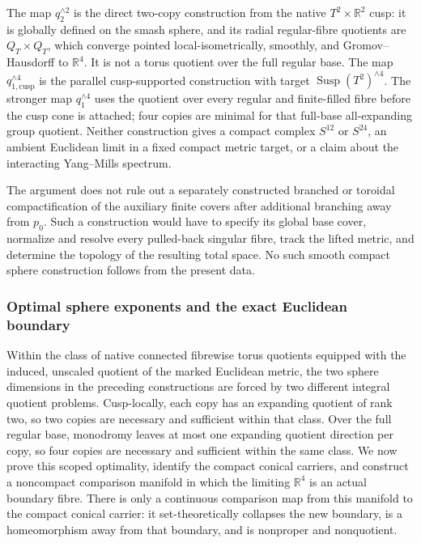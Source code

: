 The map \(q_2^{\wedge2}\) is the direct two-copy construction from the
native \(T^2\times\mathbb R^2\) cusp: it is globally defined on the smash
sphere, and its radial regular-fibre quotients are \(Q_T\times Q_T\), which
converge pointed local-isometrically, smoothly, and Gromov--Hausdorff to
\(\mathbb R^4\).  It is not a torus quotient over the full
regular base.  The map \(q_{1,\mathrm{cusp}}^{\wedge4}\) is the parallel
cusp-supported construction with target
\(\operatorname{Susp}(T^2)^{\wedge4}\).  The stronger map
\(q_1^{\wedge4}\) uses the quotient over every regular and finite-filled
fibre before the cusp cone is attached; four copies are minimal for that
full-base all-expanding group quotient.
Neither construction gives a compact complex \(S^{12}\) or \(S^{24}\), an
ambient Euclidean limit in a fixed compact metric target, or a claim about
the interacting Yang--Mills spectrum.

The argument does not rule out a separately constructed branched or
toroidal compactification of the auxiliary finite covers after additional
branching away from \(p_0\).  Such a construction would have to specify its
global base cover, normalize and resolve every pulled-back singular fibre,
track the lifted metric, and determine the topology of the resulting total
space.  No such smooth compact sphere construction follows from the present
data.


\subsubsection{Optimal sphere exponents and the exact Euclidean boundary}
\label{wb:cusp-cone-optimal-strengthening}

Within the class of native connected fibrewise torus quotients equipped with
the induced, unscaled quotient of the marked Euclidean metric, the two sphere
dimensions in the preceding constructions are forced by two different
integral quotient problems.  Cusp-locally, each copy has an expanding
quotient of rank two, so two copies are necessary and sufficient within that
class.  Over the full regular base, monodromy leaves at most one expanding
quotient direction per copy, so four copies are necessary and sufficient
within the same class.  We now prove this scoped optimality, identify the
compact conical carriers, and construct a noncompact comparison manifold in
which the limiting \(\mathbb R^4\) is an actual boundary fibre.  There is only
a continuous comparison map from this manifold to the compact conical
carrier: it set-theoretically collapses the new boundary, is a homeomorphism
away from that boundary, and is nonproper and nonquotient.

